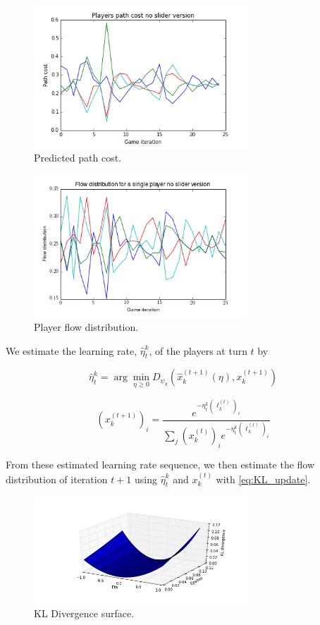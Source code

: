 \documentclass{sig-alternate-ipsn13}
\begin{document}
\begin{figure}
  \centering
  \includegraphics[width=80mm]{images/no_slider_path_costs.png}
  \caption{Predicted path cost.}
  \label{fig:predicted_path_cost}
\end{figure}


\begin{figure}
  \centering
  \includegraphics[width=80mm]{images/no_slider_actual_flow_distribution.png}
  \caption{Player flow distribution.}
  \label{fig:no_slider_player_flow_distribution}
\end{figure}

We estimate the learning rate, $\hat \eta^k_t$,  of the players at turn $t$ by

\[
  \hat \eta^k_t = \arg\min_{\eta \geq 0} D_{\psi_k}(\hat x_k^{(t+1)}(\eta), x^{(t+1)}_k)
\]

\begin{equation} \label{eq:KL_update}
  (x_k^{(t+1)})_i = \frac{e^{-\eta_t^k (\ell^{(t)}_k)_i}}{\sum_j (x_k^{(t)})_i e^{-\eta_t^k (\ell^{(t)}_k)_i}}
\end{equation}

From these estimated learning rate sequence, we then estimate the flow distribution of iteration $t+1$ using $\hat \eta^k_t $ and $x_k^{(t)}$ with \ref{eq:KL_update}.

\begin{figure}
  \centering
  \includegraphics[width=80mm]{images/no_slider_KL_divergence_surface}
  \caption{KL Divergence surface.}
  \label{fig:kl_divergence_surface}
\end{figure}
\end{document}

